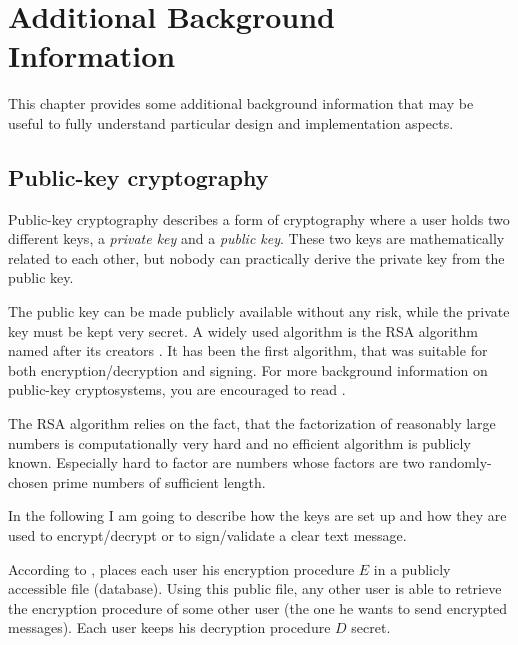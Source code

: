 \chapter{Additional Background Information}
\label{app:cha:background}

This chapter  provides some additional background information  that may be
useful to fully understand particular design and implementation aspects.

\section{Public-key cryptography}
\label{app:sec:public-key-cryptography}

Public-key  cryptography describes  a form  of cryptography  where  a user
holds  two  different  keys,  a  \emph{private  key}  and  a  \emph{public
  key}.  These two  keys are  mathematically  related to  each other,  but
nobody can practically derive the private key from the public key.

The public key can be made  publicly available without any risk, while the
private key must  be kept very secret. A widely used  algorithm is the RSA
algorithm named  after its  creators \citet*{rivest77method}. It  has been
the first algorithm, that  was suitable for both encryption/decryption and
signing.  For more background information on public-key cryptosystems, you
are encouraged to read \cite{rivest77method,diffie76new}.

The RSA algorithm relies on the fact, that the factorization of reasonably
large numbers is  computationally very hard and no  efficient algorithm is
publicly known.  Especially  hard to factor are numbers  whose factors are
two randomly-chosen prime numbers of sufficient length.

In the following  I am going to describe  how the keys are set  up and how
they are used to encrypt/decrypt or to sign/validate a clear text message.

According  to  \cite{rivest77method},  places  each  user  his  encryption
procedure $E$  in a publicly accessible file  (\eg database).  Using this
public file, any  other user is able to  retrieve the encryption procedure
of   some  other   user  (\ie the   one  he   wants  to   send  encrypted
messages). Each user keeps his decryption procedure $D$ secret.

